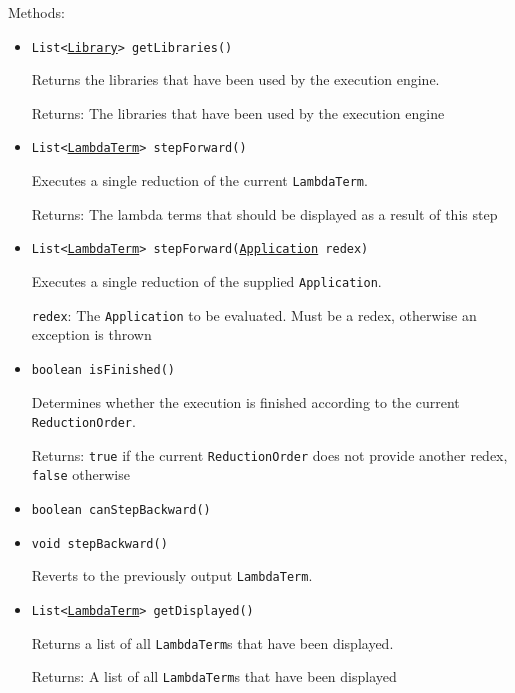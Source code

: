 Methods:
\begin{itemize}
\item \texttt{List<\hyperref[type:edu.kit.wavelength.client.model.library.Library]{Library}> getLibraries()}

Returns the libraries that have been used by the execution engine.

Returns: The libraries that have been used by the execution engine

\item \texttt{List<\hyperref[type:edu.kit.wavelength.client.model.term.LambdaTerm]{LambdaTerm}> stepForward()}

Executes a single reduction of the current \texttt{LambdaTerm}.

Returns: The lambda terms that should be displayed as a result of this step

\item \texttt{List<\hyperref[type:edu.kit.wavelength.client.model.term.LambdaTerm]{LambdaTerm}> stepForward(\hyperref[type:edu.kit.wavelength.client.model.term.Application]{Application} redex)}

Executes a single reduction of the supplied \texttt{Application}.

\texttt{redex}: The \texttt{Application} to be evaluated. Must be a redex,
            otherwise an exception is thrown

\item \texttt{boolean isFinished()}

Determines whether the execution is finished according to the current
 \texttt{ReductionOrder}.

Returns: \texttt{true} if the current \texttt{ReductionOrder} does not provide
         another redex, \texttt{false} otherwise

\item \texttt{boolean canStepBackward()}



\item \texttt{void stepBackward()}

Reverts to the previously output \texttt{LambdaTerm}.

\item \texttt{List<\hyperref[type:edu.kit.wavelength.client.model.term.LambdaTerm]{LambdaTerm}> getDisplayed()}

Returns a list of all \texttt{LambdaTerm}s that have been displayed.

Returns: A list of all \texttt{LambdaTerm}s that have been displayed


\end{itemize}
